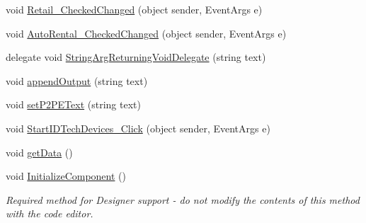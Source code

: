 \begin{DoxyCompactItemize}
\item 
void \mbox{\hyperlink{class_form_sim_1_1_form1_aa0ac63096f64895de6d57971386f8ee5}{Retail\+\_\+\+Checked\+Changed}} (object sender, Event\+Args e)
\item 
void \mbox{\hyperlink{class_form_sim_1_1_form1_adcc5acde3fe806f1d7f011e67626db1f}{Auto\+Rental\+\_\+\+Checked\+Changed}} (object sender, Event\+Args e)
\item 
delegate void \mbox{\hyperlink{class_form_sim_1_1_form1_a33ffcbbf1c37324badcb69a13ebef5e9}{String\+Arg\+Returning\+Void\+Delegate}} (string text)
\item 
void \mbox{\hyperlink{class_form_sim_1_1_form1_afd790c1181ee74c3b785002cdad0159c}{append\+Output}} (string text)
\item 
void \mbox{\hyperlink{class_form_sim_1_1_form1_a6e1199d3a12d5793d73ee11ef3ab7fc0}{set\+P2\+P\+E\+Text}} (string text)
\item 
void \mbox{\hyperlink{class_form_sim_1_1_form1_a68979f65b99bf8995c5cf842acb886f5}{Start\+I\+D\+Tech\+Devices\+\_\+\+Click}} (object sender, Event\+Args e)
\item 
void \mbox{\hyperlink{class_form_sim_1_1_form1_a1e61fd61ad2bdb7c5b75a9c0d138236b}{get\+Data}} ()
\item 
void \mbox{\hyperlink{class_form_sim_1_1_form1_af0bb58c8e4f2567486563b0b8c780538}{Initialize\+Component}} ()
\begin{DoxyCompactList}\small\item\em Required method for Designer support -\/ do not modify the contents of this method with the code editor. \end{DoxyCompactList}\end{DoxyCompactItemize}
